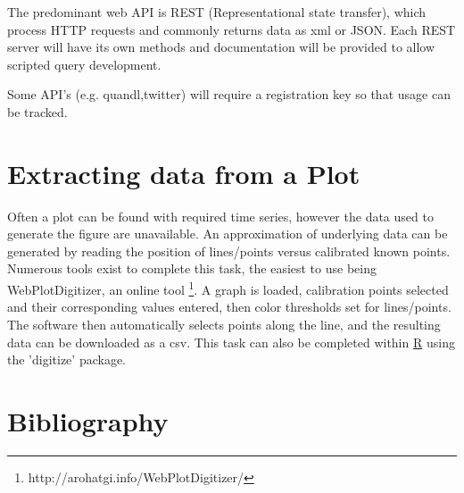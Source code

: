 \documentclass[11pt]{article}
\begin{document}
	The predominant web API is REST (Representational state transfer), which process HTTP requests and commonly returns data as xml or JSON.
	Each REST server will have its own methods and documentation will be provided to allow scripted query development.


	Some API's (e.g. quandl,twitter) will require a registration key so that usage can be tracked.

	\section{Extracting data from a Plot}\label{graph}
	Often a plot can be found with required time series, however the data used to generate the figure are unavailable.
	An approximation of underlying data can be generated by reading the position of lines/points versus calibrated known points. 
	Numerous tools exist to complete this task, the easiest to use being WebPlotDigitizer, an online tool \footnote{http://arohatgi.info/WebPlotDigitizer/}. 
	A graph is loaded, calibration points selected and their corresponding values entered, then color thresholds set for lines/points.
	The software then automatically selects points along the line, and the resulting data can be downloaded as a csv.
	This task can also be completed within \hyperref[R]{R} using the 'digitize' package.

\newpage
\section{Bibliography}


\end{document}
